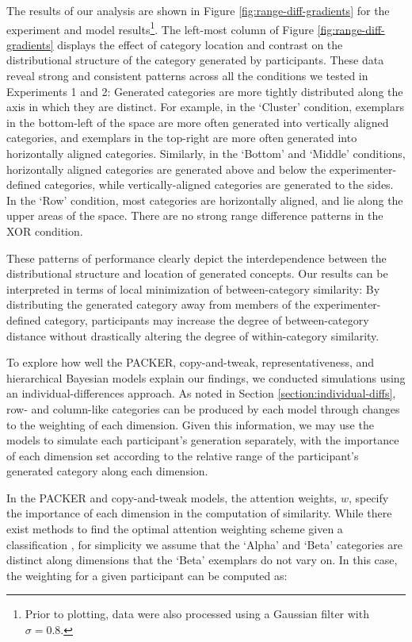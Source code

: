 \documentclass[pdflatex,sn-apa]{sn-jnl}%
\theoremstyle{thmstyleone}%
\theoremstyle{thmstyletwo}%
\theoremstyle{thmstylethree}%
\begin{document}
The results of our analysis are shown in Figure \ref{fig:range-diff-gradients}
for the experiment and model results\footnote{Prior to plotting, data were also
processed using a Gaussian filter with $\sigma = 0.8$.}. The left-most column of
Figure \ref{fig:range-diff-gradients} displays the effect of category location
and contrast on the distributional structure of the category generated by
participants. These data reveal strong and consistent patterns across all the
conditions we tested in Experiments 1 and 2: Generated categories are more
tightly distributed along the axis in which they are distinct. For example, in
the `Cluster' condition, exemplars in the bottom-left of the space are more
often generated into vertically aligned categories, and exemplars in the
top-right are more often generated into horizontally aligned categories.
Similarly, in the `Bottom' and `Middle' conditions, horizontally aligned
categories are generated above and below the experimenter-defined categories,
while vertically-aligned categories are generated to the sides. In the `Row'
condition, most categories are horizontally aligned, and lie along the upper
areas of the space. There are no strong range difference patterns in the XOR
condition.

These patterns of performance clearly depict the interdependence between the
distributional structure and location of generated concepts. Our results can be
interpreted in terms of local minimization of between-category similarity: By
distributing the generated category away from members of the
experimenter-defined category, participants may increase the degree of
between-category distance without drastically altering the degree of
within-category similarity.

To explore how well the PACKER, copy-and-tweak, representativeness, and
hierarchical Bayesian models explain our findings, we conducted simulations
using an individual-differences approach. As noted in Section
\ref{section:individual-diffs}, row- and column-like categories can be produced
by each model through changes to the weighting of each dimension. Given this
information, we may use the models to simulate each participant's generation
separately, with the importance of each dimension set according to the relative
range of the participant's generated category along each dimension.

In the PACKER and copy-and-tweak models, the attention weights, $w$, specify the
importance of each dimension in the computation of similarity. While there exist
methods to find the optimal attention weighting scheme given a classification
\citep[see][]{vanpaemel2012using}, for simplicity we assume that the `Alpha' and
`Beta' categories are distinct along dimensions that the `Beta' exemplars do
not vary on. In this case, the weighting for a given participant can be computed
as:
\end{document}
